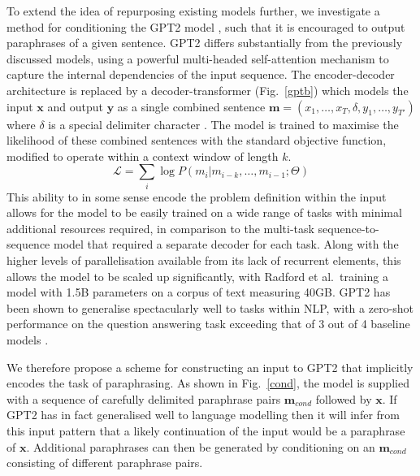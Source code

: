 \documentclass[12pt,a4paper]{article}
\begin{document}
\noindent To extend the idea of repurposing existing models further, we investigate a method for conditioning the GPT2 model \cite{gpt2}, such that it is encouraged to output paraphrases of a given sentence. GPT2 differs substantially from the previously discussed models, using a powerful multi-headed self-attention mechanism to capture the internal dependencies of the input sequence. The encoder-decoder architecture is replaced by a decoder-transformer (Fig.\ \ref{gptb}) which models the input $\mathbf{x}$ and output $\mathbf{y}$ as a single combined sentence $\mathbf{m} = (x_1,\dots,x_T, \delta, y_1,\dots,y_{T'})$ where $\delta$ is a special delimiter character \cite{transdec}. The model is trained to maximise the likelihood of these combined sentences with the standard objective function, modified to operate within a context window of length $k$.
\begin{equation}
  \mathcal{L} = \sum_i\log \mathit{P}(m_i | m_{i-k}, \dots , m_{i-1}; \Theta)
\end{equation}
This ability to in some sense encode the problem definition within the input allows for the model to be easily trained on a wide range of tasks with minimal additional resources required, in comparison to the multi-task sequence-to-sequence model that required a separate decoder for each task. Along with the higher levels of parallelisation available from its lack of recurrent elements, this allows the model to be scaled up significantly, with Radford et al.\ training a model with 1.5B parameters on a corpus of text measuring 40GB. GPT2 has been shown to generalise spectacularly well to tasks within NLP, with a zero-shot performance on the question answering task exceeding that of 3 out of 4 baseline models \cite{gpt2}.

We therefore propose a scheme for constructing an input to GPT2 that implicitly encodes the task of paraphrasing. As shown in Fig.\ \ref{cond}, the model is supplied with a sequence of carefully delimited paraphrase pairs $\mathbf{m}_{cond}$ followed by $\mathbf{x}$. If GPT2 has in fact generalised well to language modelling then it will infer from this input pattern that a likely continuation of the input would be a paraphrase of $\mathbf{x}$. Additional paraphrases can then be generated by conditioning on an $\mathbf{m}_{cond}$ consisting of different paraphrase pairs.
\end{document}
